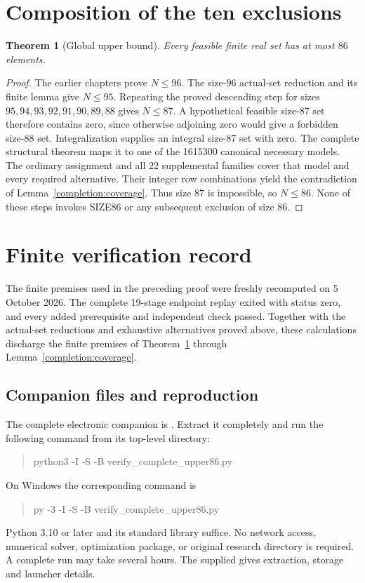 \documentclass[11pt,a4paper]{article}
\newtheorem{theorem}{Theorem}[section]
\theoremstyle{remark}
\begin{document}
\section{Composition of the ten exclusions}\label{u86:sec:composition}
\begin{theorem}[Global upper bound]
\label{u86:thm:upper86}
Every feasible finite real set has at most $86$ elements.
\end{theorem}
\begin{proof}
The earlier chapters prove $N\le96$. The size-$96$ actual-set reduction
and its finite lemma give $N\le95$. Repeating the proved descending
step for sizes $95,94,93,92,91,90,89,88$ gives $N\le87$.
A hypothetical feasible size-$87$ set therefore contains zero, since
otherwise adjoining zero would give a forbidden size-$88$ set.
Integralization supplies an integral size-$87$ set with zero.
The complete structural theorem maps it to one of the 1615300 canonical
necessary models. The ordinary assignment and all 22 supplemental
families cover that model and every required alternative. Their integer
row combinations yield the contradiction of
Lemma~\ref{completion:coverage}. Thus size $87$ is impossible, so
$N\le86$. None of these steps invokes SIZE86 or any subsequent exclusion
of size $86$.
\end{proof}


\section{Finite verification record}\label{completion:verification}

The finite premises used in the preceding proof were freshly recomputed
on 5 October 2026. The complete 19-stage endpoint replay exited with
status zero, and every added prerequisite and independent check passed.
Together with the actual-set reductions and exhaustive alternatives proved
above, these calculations discharge the finite premises of
Theorem~\ref{u86:thm:upper86} through Lemma~\ref{completion:coverage}.

\subsection{Companion files and reproduction}
The complete electronic companion is
.
Extract it completely and run the following command from its top-level
directory:
\begin{quote}\small\ttfamily
python3 -I -S -B verify\_complete\_upper86.py
\end{quote}
On Windows the corresponding command is
\begin{quote}\small\ttfamily
py -3 -I -S -B verify\_complete\_upper86.py
\end{quote}
Python 3.10 or later and its standard library suffice. No network access,
numerical solver, optimization package, or original research directory is
required. A complete run may take several hours. The supplied
 gives extraction, storage and launcher details.
\end{document}
